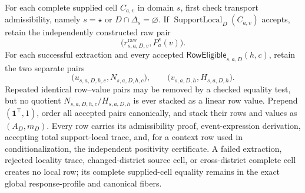 For each complete supplied cell \(C_{a,v}\) in domain \(s\), first check transport admissibility, namely \(s=\star\) or \(D\cap\Delta_s=\varnothing\).  If \(\operatorname{SupportLocal}_D(C_{a,v})\) accepts, retain the independently constructed raw pair
\[
\bigl(r^{\mathrm{raw}}_{s,a,D,v},P_a^s(v)\bigr).
\]
For each successful extraction and every accepted \(\mathsf{RowEligible}_{s,a,D}(h,c)\), retain the two separate pairs
\[
\bigl(u_{s,a,D,h,c},N_{s,a,D,h,c}\bigr),
\qquad
\bigl(v_{s,a,D,h},H_{s,a,D,h}\bigr).
\]
Repeated identical row--value pairs may be removed by a checked equality test, but no quotient \(N_{s,a,D,h,c}/H_{s,a,D,h}\) is ever stacked as a linear row value.  Prepend \((\mathbf 1^\top,1)\), order all accepted pairs canonically, and stack their rows and values as \((A_D,m_D)\).  Every row carries its admissibility proof, event-expression derivation, accepting total support-local trace, and, for a context row used in conditionalization, the independent positivity certificate.  A failed extraction, rejected locality trace, changed-district source cell, or cross-district complete cell creates no local row; its complete supplied-cell equality remains in the exact global response-profile and canonical fibers.